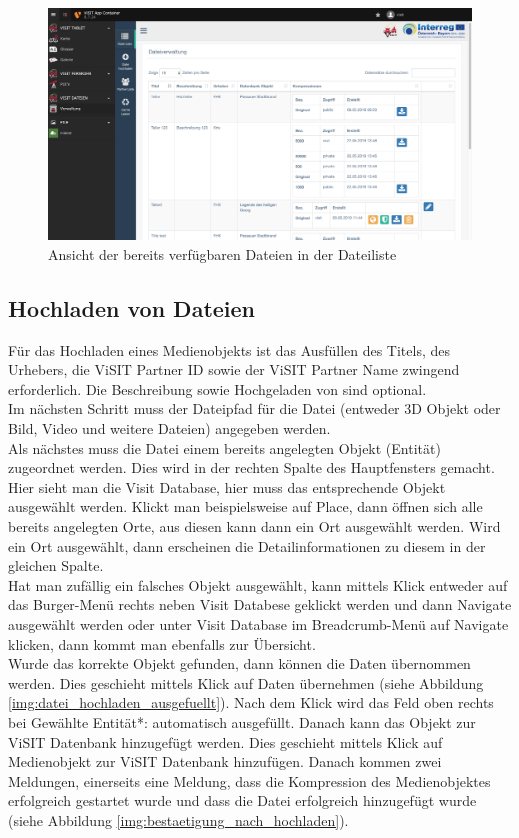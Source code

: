 \begin{figure}[ht!]
\centering
\includegraphics[width=12cm]{Figures/paula/dateiverwaltung/dateiliste.png}
\caption{Ansicht der bereits verfügbaren Dateien in der Dateiliste}
\label{img:dateiliste}
\end{figure}

\subsection{Hochladen von Dateien}

Für das Hochladen eines Medienobjekts ist das Ausfüllen des Titels, des Urhebers, die ViSIT Partner ID sowie der ViSIT Partner Name zwingend erforderlich. Die \glqq Beschreibung\grqq{} sowie \glqq Hochgeladen\grqq{} von sind optional.\\
Im nächsten Schritt muss der Dateipfad für die Datei (entweder 3D Objekt oder Bild, Video und weitere Dateien) angegeben werden.\\
Als nächstes muss die Datei einem bereits angelegten Objekt (Entität) zugeordnet werden. Dies wird in der rechten Spalte des Hauptfensters gemacht. Hier sieht man die Visit Database, hier muss das entsprechende Objekt ausgewählt werden. Klickt man beispielsweise auf \glqq Place\grqq{}, dann öffnen sich alle bereits angelegten Orte, aus diesen kann dann ein Ort ausgewählt werden. Wird ein Ort ausgewählt, dann erscheinen die Detailinformationen zu diesem in der gleichen Spalte.\\

Hat man zufällig ein falsches Objekt ausgewählt, kann mittels Klick entweder auf das Burger-Menü rechts neben Visit Databese geklickt werden und dann Navigate ausgewählt werden oder unter Visit Database im Breadcrumb-Menü auf Navigate klicken, dann kommt man ebenfalls zur Übersicht.\\

Wurde das korrekte Objekt gefunden, dann können die Daten übernommen werden. Dies geschieht mittels Klick auf \glqq Daten übernehmen\grqq{} (siehe Abbildung \ref{img:datei_hochladen_ausgefuellt}). Nach dem Klick wird das Feld oben rechts bei \glqq Gewählte Entität*:\grqq{} automatisch ausgefüllt. Danach kann das Objekt zur ViSIT Datenbank hinzugefügt werden. Dies geschieht mittels Klick auf \glqq Medienobjekt zur ViSIT Datenbank hinzufügen\grqq{}. Danach kommen zwei Meldungen, einerseits eine Meldung, dass die Kompression des Medienobjektes erfolgreich gestartet wurde und dass die Datei erfolgreich hinzugefügt wurde (siehe Abbildung \ref{img:bestaetigung_nach_hochladen}).

